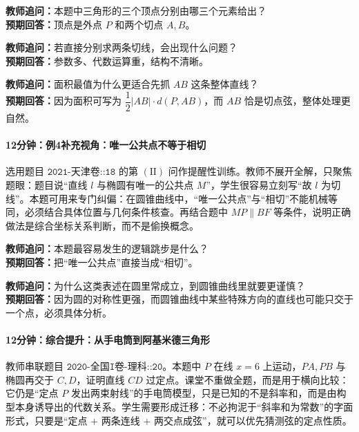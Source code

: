 \documentclass[UTF8,a4paper,11pt]{ctexart}
\begin{document}
\noindent\textbf{教师追问：}本题中三角形的三个顶点分别由哪三个元素给出？\\

\textbf{预期回答：}顶点是外点 $P$ 和两个切点 $A,B$。\par

\noindent\textbf{教师追问：}若直接分别求两条切线，会出现什么问题？\\

\textbf{预期回答：}参数多、代数运算重，结构不清晰。\par

\noindent\textbf{教师追问：}面积最值为什么更适合先抓 $AB$ 这条整体直线？\\

\textbf{预期回答：}因为面积可写为 $\dfrac12|AB|\cdot d(P,AB)$，而 $AB$ 恰是切点弦，整体处理更自然。\par

\paragraph{12分钟：例4补充视角：唯一公共点不等于相切}

选用题目 $\texttt{2021-天津卷::18}$ 的第 $(\mathrm{II})$ 问作提醒性训练。教师不展开全解，只聚焦题眼：题目说“直线 $l$ 与椭圆有唯一的公共点 $M$”，学生很容易立刻写“故 $l$ 为切线”。本题可用来专门纠偏：在圆锥曲线中，“唯一公共点”与“相切”不能机械等同，必须结合具体位置与几何条件核查。再结合题中 $MP\parallel BF$ 等条件，说明正确做法是综合坐标关系判断，而不是偷换概念。

\noindent\textbf{教师追问：}本题最容易发生的逻辑跳步是什么？\\

\textbf{预期回答：}把“唯一公共点”直接当成“相切”。\par

\noindent\textbf{教师追问：}为什么这类表述在圆里常成立，到圆锥曲线里就要更谨慎？\\

\textbf{预期回答：}因为圆的对称性更强，而圆锥曲线中某些特殊方向的直线也可能只交于一个点，必须具体分析。\par

\paragraph{12分钟：综合提升：从手电筒到阿基米德三角形}

教师串联题目 $\texttt{2020-全国I卷-理科::20}$。本题中 $P$ 在线 $x=6$ 上运动，$PA,PB$ 与椭圆再交于 $C,D$，证明直线 $CD$ 过定点。课堂不重做全题，而是用于横向比较：它仍是“定点 $P$ 发出两束射线”的手电筒模型，只是已知的不是斜率和，而是由构型本身诱导出的代数关系。学生需要形成迁移：不必拘泥于“斜率和为常数”的字面形式，只要是“定点 $+$ 两条连线 $+$ 两交点成弦”，就可以优先猜测弦的定点性质。
\end{document}
